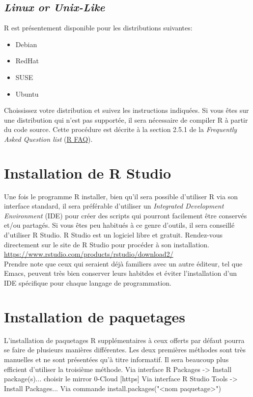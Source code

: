 \subsection{\emph{Linux or Unix-Like}}
R est présentement disponible pour les distributions suivantes:\begin{itemize}
	\item Debian
	\item RedHat
	\item SUSE
	\item Ubuntu
\end{itemize}
Choississez votre distribution et suivez les instructions indiquées. Si vous êtes sur une distribution qui n'est pas supportée, il sera nécessaire de compiler R à partir du code source. Cette procédure est décrite à la section 2.5.1 de la \emph{Frequently Asked Question list} (\href{https://cran.r-project.org/doc/FAQ/R-FAQ.html#How-can-R-be-installed-_0028Unix_002dlike_0029}{R FAQ}).

\section{Installation de R Studio}
Une fois le programme R installer, bien qu'il sera possible d'utiliser R via son interface standard, il sera préférable d'utiliser un \emph{Integrated Development Environment} (IDE) pour créer des scripts qui pourront facilement être conservés et/ou partagés. Si vous êtes peu habitués à ce genre d'outils, il sera conseillé d'utiliser R Studio. R Studio est un logiciel libre et gratuit. Rendez-vous directement sur le site de R Studio pour procéder à son installation. \\
\url{https://www.rstudio.com/products/rstudio/download2/} \\

Prendre note que ceux qui seraient déjà familiers avec un autre éditeur, tel que Emacs, peuvent très bien conserver leurs habitdes et éviter l'installation d'un IDE spécifique pour chaque langage de programmation.

\section{Installation de paquetages}
L'installation de paquetages R supplémentaires à ceux offerts par défaut pourra se faire de plusieurs manières différentes. Les deux premières méthodes sont très manuelles et ne sont présentées qu'à titre informatif. Il sera beaucoup plus efficient d'utiliser la troisième méthode.
Via interface R Packages -> Install package(s)...
	choisir le mirror 0-Cloud [https]
Via interface R Studio Tools -> Install Packages...
Via commande install.packages("<nom paquetage>")

